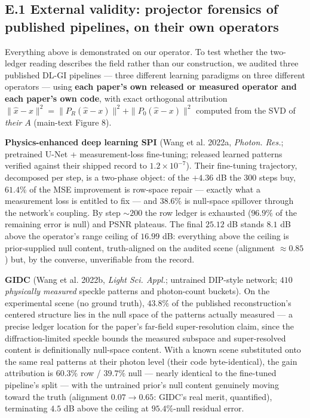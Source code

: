 \documentclass[11pt]{article}
\begin{document}
\subsection*{E.1 External validity: projector forensics of published pipelines, on their own operators}

Everything above is demonstrated on our operator. To test whether the two-ledger reading describes the field rather than our construction, we audited three published DL-GI pipelines --- three different learning paradigms on three different operators --- using \textbf{each paper's own released or measured operator and each paper's own code}, with exact orthogonal attribution $\|\hat{x}-x\|^2 = \|P_R(\hat{x}-x)\|^2 + \|P_0(\hat{x}-x)\|^2$ computed from the SVD of \textit{their} $A$ (main-text Figure 8).


\textbf{Physics-enhanced deep learning SPI} (Wang et al. 2022a, \textit{Photon. Res.}; pretrained U-Net + measurement-loss fine-tuning; released learned patterns verified against their shipped record to $1.2\times10^{-7}$). Their fine-tuning trajectory, decomposed per step, is a two-phase object: of the $+4.36$ dB the 300 steps buy, $61.4\%$ of the MSE improvement is row-space repair --- exactly what a measurement loss is entitled to fix --- and $38.6\%$ is null-space spillover through the network's coupling. By step ${\sim}200$ the row ledger is exhausted ($96.9\%$ of the remaining error is null) and PSNR plateaus. The final $25.12$ dB stands $8.1$ dB above the operator's range ceiling of $16.99$ dB: everything above the ceiling is prior-supplied null content, truth-aligned on the audited scene (alignment ${\approx}0.85$) but, by the converse, unverifiable from the record.

\textbf{GIDC} (Wang et al. 2022b, \textit{Light Sci. Appl.}; untrained DIP-style network; $410$ \textit{physically measured} speckle patterns and photon-count buckets). On the experimental scene (no ground truth), $43.8\%$ of the published reconstruction's centered structure lies in the null space of the patterns actually measured --- a precise ledger location for the paper's far-field super-resolution claim, since the diffraction-limited speckle bounds the measured subspace and super-resolved content is definitionally null-space content. With a known scene substituted onto the same real patterns at their photon level (their code byte-identical), the gain attribution is $60.3\%$ row / $39.7\%$ null --- nearly identical to the fine-tuned pipeline's split --- with the untrained prior's null content genuinely moving toward the truth (alignment $0.07 \to 0.65$: GIDC's real merit, quantified), terminating $4.5$ dB above the ceiling at $95.4\%$-null residual error.
\end{document}
